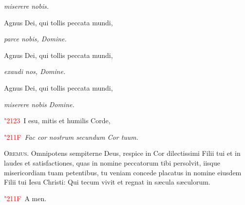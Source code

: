 \documentclass[12pt]{article}\errorcontextlines=9
\newcommand\versic[1]{%
\textcolor{red}{\char"2123\ }#1%
}
\newcommand\response[1]{%
\textcolor{red}{\char"211F\ }#1%
}
\begin{document}
\begin{multicols}{2}
\hfill\textit{miserere nobis.}

Agnus Dei, qui tollis peccata mundi,

\hfill\textit{parce nobis, Domine.}

Agnus Dei, qui tollis peccata mundi,

\hfill\textit{exaudi nos, Domine.}

Agnus Dei, qui tollis peccata mundi,

\hfill\textit{miserere nobis Domine.}

\bigskip

\versic Iesu, mitis et humilis Corde,

\response \textit{Fac cor nostrum secundum Cor tuum.}

\bigskip

\lettrine{O}{\color{red}remus}. Omnipotens sempiterne Deus, respice in Cor dilectissimi Filii tui et in laudes et satisfactiones, 
quas in nomine peccatorum tibi persolvit, iisque misericordiam tuam petentibus, tu veniam concede placatus in nomine eiusdem 
Filii tui Iesu Christi: Qui tecum vivit et regnat in s\ae cula s\ae culorum.

\response Amen.

\end{multicols}

\restoregeometry
\end{document}
